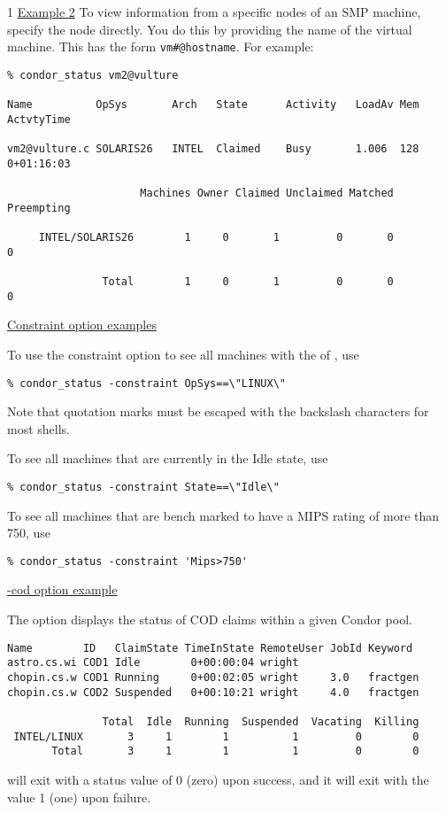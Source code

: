 \begin{ManPage}{\label{man-condor-status}}{1}
\underline{Example 2} To view information from a specific nodes of an
SMP machine, specify the node directly.
You do this by providing the name of the virtual machine.
This has the form \texttt{vm\#@hostname}.
For example:
\footnotesize
\begin{verbatim}
% condor_status vm2@vulture

Name          OpSys       Arch   State      Activity   LoadAv Mem   ActvtyTime

vm2@vulture.c SOLARIS26   INTEL  Claimed    Busy       1.006  128   0+01:16:03

                     Machines Owner Claimed Unclaimed Matched Preempting

     INTEL/SOLARIS26        1     0       1         0       0          0

               Total        1     0       1         0       0          0
\end{verbatim}
\normalsize

\underline{Constraint option examples}

To use the constraint option to see all machines with the 
of , use
\begin{verbatim}
% condor_status -constraint OpSys==\"LINUX\"
\end{verbatim}
Note that quotation marks must be escaped with the backslash characters
for most shells.

To see all machines that are currently in the Idle state, use
\begin{verbatim}
% condor_status -constraint State==\"Idle\"
\end{verbatim}

To see all machines that are bench marked to have a MIPS rating
of more than 750, use
\begin{verbatim}
% condor_status -constraint 'Mips>750' 
\end{verbatim}

\underline{-cod option example}

The  option displays the status of COD
claims within a given Condor pool. 

\footnotesize
\begin{verbatim}
Name        ID   ClaimState TimeInState RemoteUser JobId Keyword
astro.cs.wi COD1 Idle        0+00:00:04 wright
chopin.cs.w COD1 Running     0+00:02:05 wright     3.0   fractgen
chopin.cs.w COD2 Suspended   0+00:10:21 wright     4.0   fractgen

               Total  Idle  Running  Suspended  Vacating  Killing
 INTEL/LINUX       3     1        1          1         0        0
       Total       3     1        1          1         0        0
\end{verbatim}
\normalsize


\ExitStatus

 will exit with a status value of 0 (zero) upon success,
and it will exit with the value 1 (one) upon failure.

\end{ManPage}

